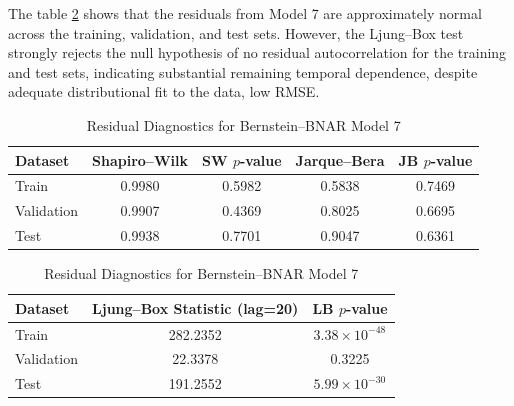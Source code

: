 \documentclass{article}
\begin{document}
The table \ref{tab:residual_diagnostics_model7} shows that the residuals from Model 7 are approximately normal across the training, validation, and test sets. However, the Ljung–Box test strongly rejects the null hypothesis of no residual autocorrelation for the training and test sets, indicating substantial remaining temporal dependence, despite adequate distributional fit to the data, low RMSE.
\begin{table}[htbp]
\centering
\caption{Residual Diagnostics for Bernstein--BNAR Model 7}
\label{tab:residual_diagnostics_model7}

\begin{tabular}{lcccc}
\hline
\textbf{Dataset} 
& \textbf{Shapiro--Wilk} 
& \textbf{SW $p$-value} 
& \textbf{Jarque--Bera} 
& \textbf{JB $p$-value} \\
\hline
Train       & 0.9980 & 0.5982 & 0.5838 & 0.7469 \\
Validation  & 0.9907 & 0.4369 & 0.8025 & 0.6695 \\
Test        & 0.9938 & 0.7701 & 0.9047 & 0.6361 \\
\hline
\end{tabular}

\vspace{0.6em}

\begin{tabular}{lcc}
\hline
\textbf{Dataset} 
& \textbf{Ljung--Box Statistic (lag=20)} 
& \textbf{LB $p$-value} \\
\hline
Train       & 282.2352 & $3.38 \times 10^{-48}$ \\
Validation  & 22.3378  & 0.3225 \\
Test        & 191.2552 & $5.99 \times 10^{-30}$ \\
\hline
\end{tabular}

\vspace{0.6em}
\end{table}
\end{document}
